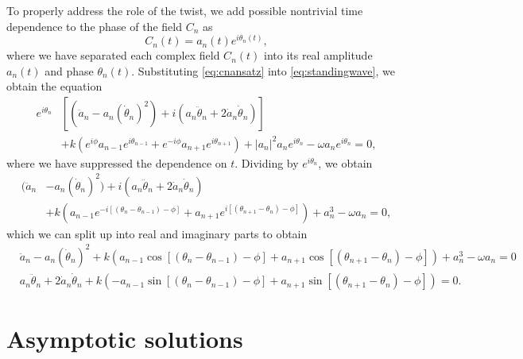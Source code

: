 \documentclass[11pt,reqno]{amsart}
\begin{document}
To properly address the role of the twist, we add possible nontrivial time dependence to the phase of the field $C_n$ as
\begin{equation}\label{eq:cnansatz}
C_n(t) = a_n(t)e^{i \theta_n(t)},
\end{equation}
where we have separated each complex field $C_n(t)$ into its real amplitude $a_n(t)$ and phase $\theta_n(t)$. Substituting \cref{eq:cnansatz} into \cref{eq:standingwave}, we obtain the equation
\begin{align*}
e^{i \theta_n}&\left[ (\ddot a_n - a_n (\dot \theta_n)^2) 
+ i ( a_n \ddot\theta_n + 2 \dot a_n \dot \theta_n ) \right] \\
&+ k\left(e^{i\phi}a_{n-1}e^{i \theta_{n-1}} +e^{-i\phi}a_{n+1}e^{i \theta_{n+1}}\right)+|a_n|^2 a_n e^{i \theta_n} - \omega a_n e^{i \theta_n} = 0,
\end{align*}
where we have suppressed the dependence on $t$. Dividing by $e^{i \theta_n}$, we obtain
\begin{equation}\label{eq:st2}
\begin{aligned}
(\ddot a_n &- a_n (\dot \theta_n)^2) 
+ i ( a_n \ddot\theta_n + 2 \dot a_n \dot \theta_n )\\
&+ k\left(a_{n-1}e^{-i[(\theta_n - \theta_{n-1}) - \phi]} + a_{n+1}e^{i[(\theta_{n+1} - \theta_{n}) - \phi]} \right)+a_n^3 - \omega a_n = 0,
\end{aligned}
\end{equation}  
which we can split up into real and imaginary parts to obtain
\begin{align}
&\ddot a_n - a_n (\dot \theta_n)^2 +
 k\left(a_{n-1}\cos[(\theta_n - \theta_{n-1}) - \phi] + a_{n+1}\cos[(\theta_{n+1} - \theta_{n}) - \phi] \right)+a_n^3 - \omega a_n = 0 \label{eq:st2real} \\
&a_n \ddot\theta_n + 2 \dot a_n \dot \theta_n
+ k\left(-a_{n-1}\sin[(\theta_n - \theta_{n-1}) - \phi] + a_{n+1}\sin [(\theta_{n+1} - \theta_{n}) - \phi] \right) = 0. \label{eq:st2imag}
\end{align}

\section{Asymptotic solutions}\label{sec:asymp}
\end{document}
